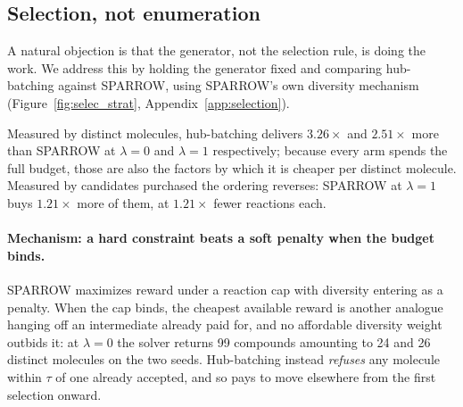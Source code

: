 \documentclass{article}
\newcommand{\checkval}[1]{#1}
\begin{document}
\subsection{Selection, not enumeration}
\label{sec:selection}




A natural objection is that the generator, not the selection rule, is doing the work. We address this by holding the generator fixed \citep{gainski2026scent} and comparing hub-batching against SPARROW, using SPARROW's own diversity mechanism \citep{fromer2025diversity} (Figure~\ref{fig:selec_strat}, Appendix~\ref{app:selection}).


Measured by distinct molecules, hub-batching delivers \checkval{$3.26\times$} and \checkval{$2.51\times$} more than SPARROW at $\lambda = 0$ and $\lambda = 1$ respectively; because every arm spends the full budget, those are also the factors by which it is cheaper per distinct molecule. Measured by candidates purchased the ordering reverses: SPARROW at $\lambda=1$ buys \checkval{$1.21\times$} more of them, at \checkval{$1.21\times$} fewer reactions each.

\paragraph{Mechanism: a hard constraint beats a soft penalty when the budget binds.}
SPARROW maximizes reward under a reaction cap with diversity entering as a penalty. When
the cap binds, the cheapest available reward is another analogue hanging off an intermediate already paid for, and no affordable diversity weight outbids it: at $\lambda = 0$ the solver returns \checkval{99} compounds amounting to \checkval{24} and \checkval{26} distinct molecules on the two seeds. Hub-batching instead \emph{refuses} any molecule within $\tau$ of one already accepted, and so pays to move elsewhere from the first selection onward.
\end{document}

